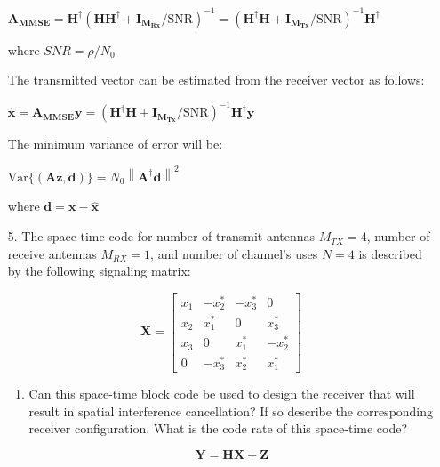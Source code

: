 \documentclass[fleqn]{article}
\makeatletter
\newcommand{\norm}[1]{\left \lVert #1 \right \rVert}
\newenvironment{equationCenter}{\@fleqnfalse\begin{equation*}}{\end{equation*}}
\makeatother
\begin{document}
\begin{enumerate}
		$\mathbf{A_{MMSE}} = \mathbf{H^{\dagger}}(\mathbf{HH^{\dagger}} + \mathbf{I_{M_{Rx}}}/\text{SNR})^{-1} = (\mathbf{H^{\dagger}H} + \mathbf{I_{M_{Tx}}}/\text{SNR})^{-1}\mathbf{H^{\dagger}}$
		
		where $SNR = \rho/N_0$
		
		The transmitted vector can be estimated from the receiver vector as follows:
		
		$\mathbf{\hat{x}} = \mathbf{A_{MMSE}y} =(\mathbf{H^{\dagger}H} + \mathbf{I_{M_{Tx}}}/\text{SNR})^{-1}\mathbf{H^{\dagger}y}$
		
		The minimum variance of error will be:
		
		$\text{Var}\{(\mathbf{Az},\mathbf{d})\} = N_0\norm{\mathbf{A^{\dagger}d}}^2$
		
		where $\mathbf{d} = \mathbf{x} - \mathbf{\hat{x}}$
		
		\item[5.] The space-time code for number of transmit antennas $M_{TX}=4$, number of receive antennas $M_{RX}=1$, and number of channel's uses $N=4$ is described by the following signaling matrix:
		
		\begin{equationCenter}
			\mathbf{X} = \begin{bmatrix}
				x_1 & -x_2^* & -x_3^* &  0 \\ 
				x_2 &  x_1^* &  0     &  x_3^* \\
				x_3 &  0     &  x_1^* & -x_2^* \\
				0   & -x_3^* &  x_2^* &  x_1^*
			\end{bmatrix}
		\end{equationCenter}
		
		\begin{enumerate}
			\item Can this space-time block code be used to design the receiver that will result in spatial interference cancellation? If so describe the corresponding receiver configuration. What is the code rate of this space-time code?
			
			\begin{equation*}
				\mathbf{Y} = \mathbf{H}\mathbf{X} + \mathbf{Z}
			\end{equation*}
			

\end{enumerate}
\end{enumerate}
\end{document}
